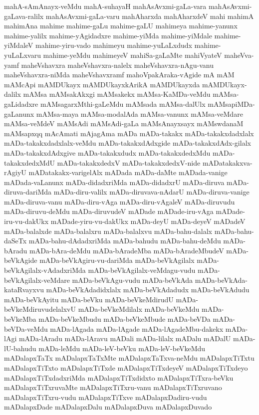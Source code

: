 {mahA-sAmAnayx-veMdu
mahA-suhayaH
mahAsAvxmi-gaLa-vara
mahAsAvxmi-gaLava-ralilx
mahAsAvxmi-gaLa-varu
mahAharxda
mahAharxdeV
mahi
mahimA
mahimAna
mahime
mahime-gaLu
mahime-gaLU
mahimeya
mahime-yanunx
mahime-yalilx
mahime-yAgidadxre
mahime-yiMda
mahime-yiMdale
mahime-yiMdaleV
mahime-yiru-vado
mahimeyu
mahime-yuLaLxdudx
mahime-yuLaLxvaru
mahime-yeMdu
mahimeyeV
mahiSa-gaLaMte
mahiVyateV
maheVva-yamf
maheVshavxra
maheVshavxra-nalelx
maheVshavxra-nAgu-vanu
maheVshavxra-niMda
maheVshavxramf
mahoVpakAraka-vAgide
mA
mAM
mAMcApi
mAMDUkayx
mAMDUkayxkArikA
mAMDUkayxda
mAMDUkayx-dalilx
mAMsa
mAMsakAkxgi
mAMsakekx
mAMsa-KaMDa-veMdu
mAMsa-gaLidadxre
mAMsagarxMthi-gaLeMdu
mAMsada
mAMsa-dalUlx
mAMsapiMDa-gaLanunx
mAMsa-maya
mAMsa-modalAda
mAMsa-vanunx
mAMsa-veMdare
mAMsa-veMdeV
mAMsAdi
mAMsAdi-gaLa
mAMsAnayxsayx
mAMswdanaM
mAMsapxqq
mAcAmati
mAjagAma
mADa
mADa-takakx
mADa-takakxdadxlalx
mADa-takakxdadxlalx-veMdu
mADa-takakxdAdxgide
mADa-takakxdAdx-gilalx
mADa-takakxdAdxgive
mADa-takakxdudx
mADa-takakxdedxMdu
mADa-takakxdedxMdU
mADa-takakxdedxV
mADa-takakxdedxV-nide
mADatakakxva-rAgiyU
mADatakakx-varigelAlx
mADada
mADa-daMte
mADada-vanige
mADada-vaLanunx
mADa-didadxriMda
mADa-didadxrU
mADa-diruva
mADa-diruva-dariMda
mADa-diru-valilx
mADa-diruvava-nAdarU
mADa-diruva-vanige
mADa-diruva-vanu
mADa-diru-vAga
mADa-diru-vAgaleV
mADa-diruvudu
mADa-diruvu-deMdu
mADa-diruvudeV
mADade
mADade-iru-vAga
mADade-iru-vu-dakUkx
mADade-yiru-vu-dakUkx
mADa-deyU
mADa-deyeV
mADadeV
mADa-balalxde
mADa-balalxru
mADa-balalxvu
mADa-bahu-dalalx
mADa-bahu-daSeTx
mADa-bahu-dAdadxriMda
mADa-bahudu
mADa-bahu-deMdu
mADa-bAradu
mADa-bAra-deMdu
mADa-bAradeMba
mADa-bAradeMbudeV
mADa-beVkAgide
mADa-beVkAgiru-vu-dariMda
mADa-beVkAgilalx
mADa-beVkAgilalx-vAdadxriMda
mADa-beVkAgilalx-veMdagu-vudu
mADa-beVkAgilalx-veMdare
mADa-beVkAgu-vudu
mADa-beVkAda
mADa-beVkAda-kataRvayxvu
mADa-beVkAdadidxlalx
mADa-beVkAdadudx
mADa-beVkAdudu
mADa-beVkAyitu
mADa-beVku
mADa-beVkeMdirudU
mADa-beVkeMdiruvudelalxvU
mADa-beVkeMdilalx
mADa-beVkeMdu
mADa-beVkeMba
mADa-beVkeMbudu
mADa-beVkeMbude
mADa-beVDa
mADa-beVDa-veMdu
mADa-lAgada
mADa-lAgade
mADa-lAgadeMbu-dakekx
mADa-lAgi
mADa-lAradu
mADa-lAravu
mADali
mADa-lilalx
mADalu
mADalU
mADa-lU-bahudu
mADa-leMdu
mADa-leV-beVku
mADa-leV-beVkeMdu
mADalapxTaTx
mADalapxTaTxMte
mADalapxTaTxva-neMdu
mADalapxTiTxtu
mADalapxTiTxto
mADalapxTiTxde
mADalapxTiTxdeyeV
mADalapxTiTxdeyo
mADalapxTiTxdadxriMda
mADalapxTiTxdidxto
mADalapxTiTxra-beVku
mADalapxTiTxruvaMte
mADalapxTiTxru-vanu
mADalapxTiTxruvano
mADalapxTiTxru-vudu
mADalapxTiTxve
mADalapxDadiru-vudu
mADalapxDade
mADalapxDalu
mADalapxDuva
mADalapxDuvado
}
